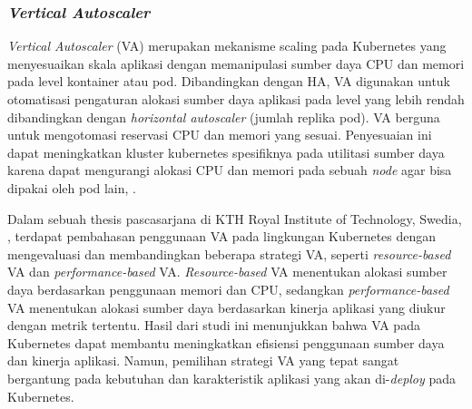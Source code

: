 \subsubsection{\textit{Vertical Autoscaler}}
\textit{Vertical Autoscaler} (VA) merupakan mekanisme scaling pada Kubernetes yang menyesuaikan skala aplikasi dengan memanipulasi sumber daya CPU dan memori pada level kontainer atau pod.
Dibandingkan dengan HA, VA digunakan untuk otomatisasi pengaturan alokasi sumber daya aplikasi pada level yang lebih rendah dibandingkan dengan \textit{horizontal autoscaler} (jumlah replika pod).
VA berguna untuk mengotomasi reservasi CPU dan memori yang sesuai. 
Penyesuaian ini dapat meningkatkan kluster kubernetes spesifiknya pada utilitasi sumber daya karena dapat mengurangi alokasi CPU dan memori pada sebuah \textit{node} agar bisa dipakai oleh pod lain, \parencite{vpa2}.

Dalam sebuah thesis pascasarjana di KTH Royal Institute of Technology, Swedia, \parencite{predictiveva}, terdapat pembahasan penggunaan VA pada lingkungan Kubernetes dengan mengevaluasi dan membandingkan beberapa strategi VA, seperti \textit{resource-based} VA dan \textit{performance-based} VA. \textit{Resource-based} VA menentukan alokasi sumber daya berdasarkan penggunaan memori dan CPU, sedangkan \textit{performance-based} VA menentukan alokasi sumber daya berdasarkan kinerja aplikasi yang diukur dengan metrik tertentu. Hasil dari studi ini menunjukkan bahwa VA pada Kubernetes dapat membantu meningkatkan efisiensi penggunaan sumber daya dan kinerja aplikasi. Namun, pemilihan strategi VA yang tepat sangat bergantung pada kebutuhan dan karakteristik aplikasi yang akan di-\textit{deploy} pada Kubernetes.


